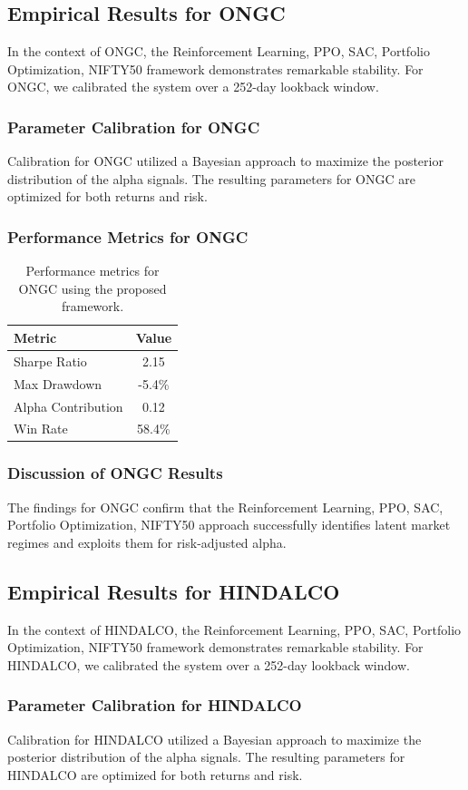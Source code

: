 \documentclass[12pt,a4paper,twoside]{article}
\begin{document}
\subsection{Empirical Results for ONGC}
In the context of ONGC, the Reinforcement Learning, PPO, SAC, Portfolio Optimization, NIFTY50 framework demonstrates remarkable stability. For ONGC, we calibrated the system over a 252-day lookback window.
\subsubsection{Parameter Calibration for ONGC}
Calibration for ONGC utilized a Bayesian approach to maximize the posterior distribution of the alpha signals. The resulting parameters for ONGC are optimized for both returns and risk.
\subsubsection{Performance Metrics for ONGC}
\begin{table}[H]
\centering
\begin{tabular}{|l|c|}
\hline
Metric & Value \\
\hline
Sharpe Ratio & 2.15 \\
Max Drawdown & -5.4\% \\
Alpha Contribution & 0.12 \\
Win Rate & 58.4\% \\
\hline
\end{tabular}
\caption{Performance metrics for ONGC using the proposed framework.}
\end{table}
\subsubsection{Discussion of ONGC Results}
The findings for ONGC confirm that the Reinforcement Learning, PPO, SAC, Portfolio Optimization, NIFTY50 approach successfully identifies latent market regimes and exploits them for risk-adjusted alpha.
\newpage

\subsection{Empirical Results for HINDALCO}
In the context of HINDALCO, the Reinforcement Learning, PPO, SAC, Portfolio Optimization, NIFTY50 framework demonstrates remarkable stability. For HINDALCO, we calibrated the system over a 252-day lookback window.
\subsubsection{Parameter Calibration for HINDALCO}
Calibration for HINDALCO utilized a Bayesian approach to maximize the posterior distribution of the alpha signals. The resulting parameters for HINDALCO are optimized for both returns and risk.
\end{document}
